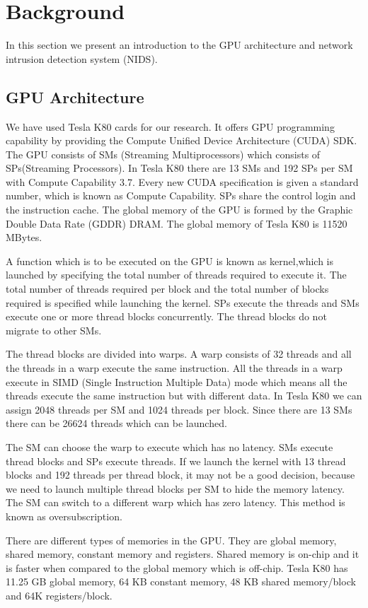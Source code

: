 \chapter{Background}

In this section we present an introduction to the GPU architecture and network intrusion detection system (NIDS).

\section{GPU Architecture} 
We have used Tesla K80 cards for our research. It offers GPU programming capability by providing the Compute Unified Device Architecture (CUDA) SDK. The GPU consists of SMs (Streaming Multiprocessors) which consists of SPs(Streaming Processors). In Tesla K80 there are 13 SMs and 192 SPs per SM with Compute Capability 3.7. Every new CUDA specification is given a standard number, which is known as Compute Capability. SPs share the control login and the instruction cache. The global memory of the GPU is formed by the Graphic Double Data Rate (GDDR) DRAM. The global memory of Tesla K80 is 11520 MBytes.

A function which is to be executed on the GPU is known as kernel,which is launched by specifying the total number of threads required to execute it. The total number of threads required per block and the total number of blocks required is specified while launching the kernel. SPs execute the threads and SMs execute one or more thread blocks concurrently. The thread blocks do not migrate to other SMs. 

The thread blocks are divided into warps. A warp consists of 32 threads and all the threads in a warp execute the same instruction. All the threads in a warp execute in SIMD (Single Instruction Multiple Data) mode which means all the threads execute the same instruction but with different data. In Tesla K80 we can assign 2048 threads per SM and 1024 threads per block. Since there are 13 SMs there can be 26624 threads which can be launched.

The SM can choose the warp to execute which has no latency. SMs execute thread blocks and SPs execute threads. If we launch the kernel with 13 thread blocks and 192 threads per thread block, it may not be a good decision, because we need to launch multiple thread blocks per SM to hide the memory latency. The SM can switch to a different warp which has zero latency. This method is known as oversubscription.

There are different types of memories in the GPU. They are global memory, shared memory, constant memory and registers. Shared memory is on-chip and it is faster when compared to the global memory which is off-chip. Tesla K80 has 11.25 GB global memory, 64 KB constant memory, 48 KB shared memory/block and 64K registers/block. 


